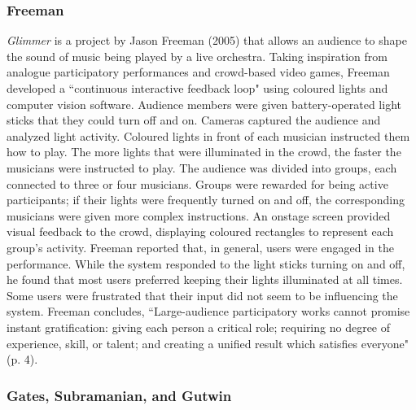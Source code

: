 \subsubsection{Freeman}

\textit{Glimmer} is a project by Jason Freeman (2005) that allows an audience to shape the sound of music being played by a live orchestra. Taking inspiration from analogue participatory performances and crowd-based video games, Freeman developed a ``continuous interactive feedback loop" using coloured lights and computer vision software. Audience members were given battery-operated light sticks that they could turn off and on. Cameras captured the audience and analyzed light activity. Coloured lights in front of each musician instructed them how to play. The more lights that were illuminated in the crowd, the faster the musicians were instructed to play. The audience was divided into groups, each connected to three or four musicians. Groups were rewarded for being active participants; if their lights were frequently turned on and off, the corresponding musicians were given more complex instructions. An onstage screen provided visual feedback to the crowd, displaying coloured rectangles to represent each group's activity. Freeman reported that, in general, users were engaged in the performance. While the system responded to the light sticks turning on and off, he found that most users preferred keeping their lights illuminated at all times. Some users were frustrated that their input did not seem to be influencing the system. Freeman concludes, ``Large-audience participatory works cannot promise instant gratification: giving each person a critical role; requiring no degree of experience, skill, or talent; and creating a unified result which satisfies everyone" (p. 4).

\subsubsection{Gates, Subramanian, and Gutwin}

